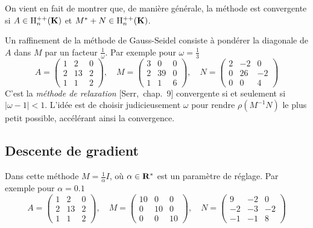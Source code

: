 \begin{remark}
On vient en fait de montrer que, de manière générale, la méthode est
convergente si $A \in \mathrm{H}^{++}_n(\mathbf{K})$ et $M^* + N \in \mathrm{H}^{++}_n(\mathbf{K})$.
\end{remark}
\begin{remark}
Un raffinement de la méthode de Gauss-Seidel consiste à pondérer la diagonale
de $A$ dans $M$ par un facteur $\frac{1}{\omega}$. Par exemple pour $\omega =
\frac{1}{3}$
\[
A = \left(\begin{array}{ccc}
1 & 2 & 0 \\
2 & 13 & 2 \\
1 & 1 & 2
\end{array}\right)
, \quad M = \left(\begin{array}{ccc}
3 & 0 & 0 \\
2 & 39 & 0 \\
1 & 1 & 6
\end{array}\right)
, \quad N = \left(\begin{array}{ccc}
2 & -2 & 0 \\
0 & 26 & -2 \\
0 & 0 & 4
\end{array}\right)
\]
C'est la \emph{méthode de relaxation} [Serr,~chap.~9]
convergente si et seulement si $|\omega-1| < 1$. L'idée est de choisir
judicieusement $\omega$ pour rendre $\rho(M^{-1}N)$ le plus petit possible,
accélérant ainsi la convergence.
\end{remark}

\subsection{Descente de gradient}

Dans cette méthode $M = \frac{1}{\alpha} I$, où $\alpha \in \mathbf{R}^*$ est un
paramètre de réglage. Par exemple pour $\alpha = 0.1$
\begin{displaymath}
A = \left(\begin{array}{ccc}
1 & 2 & 0 \\
2 & 13 & 2 \\
 1 & 1 & 2
\end{array}\right)
, \quad M = \left(\begin{array}{ccc}
10 & 0 & 0 \\
0 & 10 & 0 \\
 0 & 0 & 10
\end{array}\right)
, \quad N = \left(\begin{array}{ccc}
9 & -2 & 0 \\
-2 & -3 & -2 \\
-1 & -1 & 8
\end{array}\right)
\end{displaymath}

